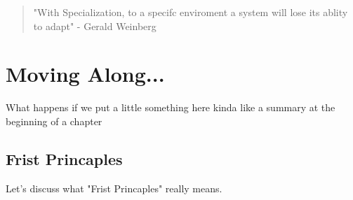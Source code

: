 \documentclass[12pt,A5]{report}
\begin{document}
\begin{quote}
"With Specialization, to a specifc enviroment a system will lose its ablity to adapt" - Gerald Weinberg

\end{quote}


\chapter{Moving Along...}

What happens if we put a little something here kinda like a summary at the beginning of a chapter

\section{Frist Princaples}

Let's discuss what "Frist Princaples" really means.
\end{document}

